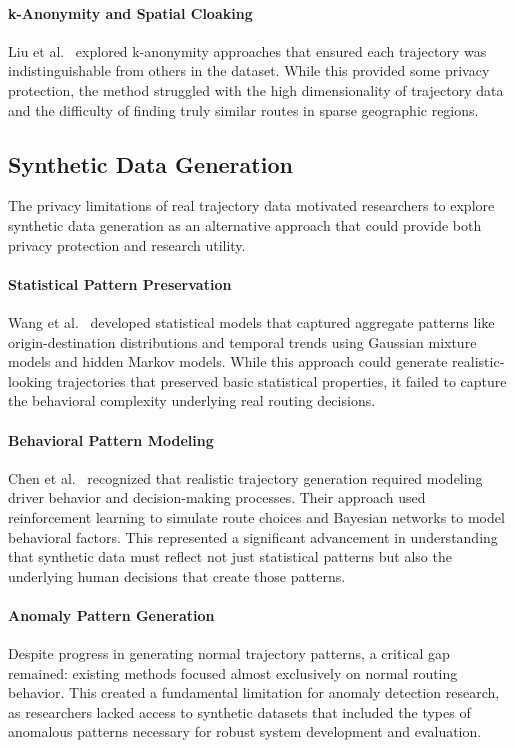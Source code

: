 \documentclass[runningheads]{llncs}
\begin{document}
\paragraph{k-Anonymity and Spatial Cloaking}
Liu et al.~\cite{liu2023enhanced} explored k-anonymity approaches that ensured each trajectory was indistinguishable from others in the dataset. While this provided some privacy protection, the method struggled with the high dimensionality of trajectory data and the difficulty of finding truly similar routes in sparse geographic regions.

\subsection{Synthetic Data Generation}
\label{sec:generation-review}

The privacy limitations of real trajectory data motivated researchers to explore synthetic data generation as an alternative approach that could provide both privacy protection and research utility.

\paragraph{Statistical Pattern Preservation}
Wang et al.~\cite{wang2023comprehensive} developed statistical models that captured aggregate patterns like origin-destination distributions and temporal trends using Gaussian mixture models and hidden Markov models. While this approach could generate realistic-looking trajectories that preserved basic statistical properties, it failed to capture the behavioral complexity underlying real routing decisions.

\paragraph{Behavioral Pattern Modeling}
Chen et al.~\cite{chen2023behavior} recognized that realistic trajectory generation required modeling driver behavior and decision-making processes. Their approach used reinforcement learning to simulate route choices and Bayesian networks to model behavioral factors. This represented a significant advancement in understanding that synthetic data must reflect not just statistical patterns but also the underlying human decisions that create those patterns.

\paragraph{Anomaly Pattern Generation}
Despite progress in generating normal trajectory patterns, a critical gap remained: existing methods focused almost exclusively on normal routing behavior. This created a fundamental limitation for anomaly detection research, as researchers lacked access to synthetic datasets that included the types of anomalous patterns necessary for robust system development and evaluation.
\end{document}
